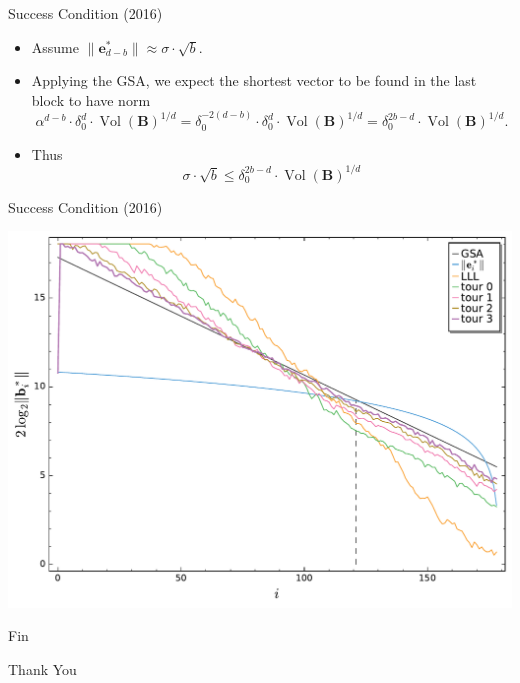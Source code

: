 \documentclass[presentation,smaller]{beamer}
\renewcommand{\vec}[1]{\mathbf{#1}\xspace}
\newcommand{\mat}[1]{\mathbf{#1}\xspace}
\DeclareMathOperator{\Vol}{Vol}
\begin{document}
\begin{frame}[label={sec:org39f48b5}]{Success Condition (2016)}
\begin{itemize}
\item Assume \(\|\vec{e}^*_{d-b}\| ≈ σ ⋅ \sqrt{b}\).
\item Applying the GSA, we expect the shortest vector to be found in the last block to have norm \[α^{d-b} ⋅ δ_0^d ⋅ {\Vol(\mat{B})}^{1/d} = δ_0^{-2(d-b)} ⋅ δ_0^d ⋅ {\Vol(\mat{B})}^{1/d} = δ_0^{2b-d} ⋅ {\Vol(\mat{B})}^{1/d}.\]

\item Thus  \[σ ⋅ \sqrt{b} ≤ δ_0^{2b-d} ⋅ {\Vol(\mat{B})}^{1/d}\]
\end{itemize}
\end{frame}

\begin{frame}[label={sec:org842da7e}]{Success Condition (2016)}
\begin{center}
\includegraphics[width=.9\linewidth]{./usvp-2016-visualisation.pdf}
\end{center}
\end{frame}

\begin{frame}[standout,label={sec:org0b95f06}]{Fin}
\begin{center}
\Huge \alert{Thank You}
\end{center}
\end{frame}
\end{document}
